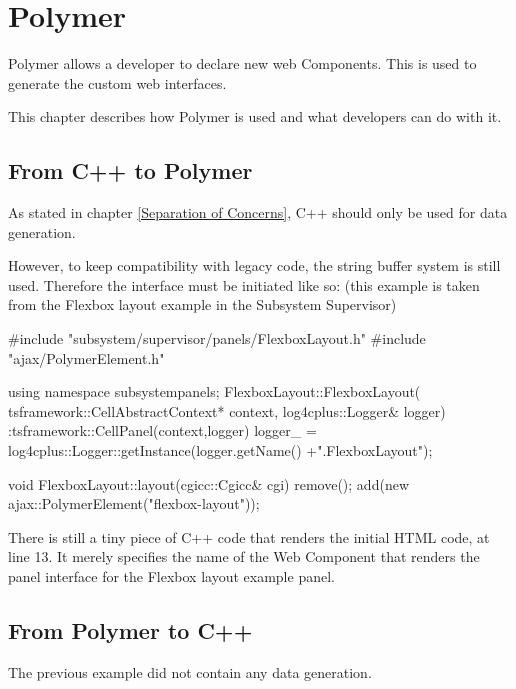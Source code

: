 \chapter{Polymer}
Polymer allows a developer to declare new web Components. This is used to generate
the custom web interfaces.

This chapter describes how Polymer is used and what developers can do with it.

\section{From C++ to Polymer}
As stated in chapter \ref{Separation of Concerns}, C++ should only be used for
data generation.

However, to keep compatibility with legacy code, the string buffer
system is still used. Therefore the interface must be initiated like so:
(this example is taken from the Flexbox layout example in the Subsystem Supervisor)
\begin{pyglist}[language=cpp,numbers=left,numbersep=5pt,fontsize=\small]
#include "subsystem/supervisor/panels/FlexboxLayout.h"
#include "ajax/PolymerElement.h"

using namespace subsystempanels;
FlexboxLayout::FlexboxLayout( tsframework::CellAbstractContext* context,
                              log4cplus::Logger& logger)
:tsframework::CellPanel(context,logger) {
  logger_ = log4cplus::Logger::getInstance(logger.getName() +".FlexboxLayout");
}

void FlexboxLayout::layout(cgicc::Cgicc& cgi) {
  remove();
  add(new ajax::PolymerElement("flexbox-layout"));
}
\end{pyglist}

There is still a tiny piece of C++ code that renders the initial HTML
code, at line 13.
It merely specifies the name of the Web Component that renders the panel interface
for the Flexbox layout example panel.

\section{From Polymer to C++}
\label{From Polymer to C++}
The previous example did not contain any data generation.


